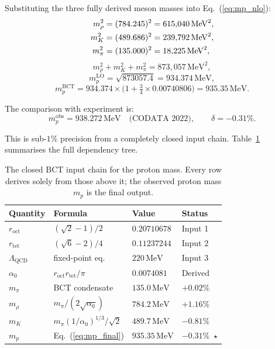 \documentclass[twocolumn,10pt,a4paper]{article}
\begin{document}
Substituting the three fully derived meson masses into
Eq.~(\ref{eq:mp_nlo}):
\begin{align}
  m_\rho^2 &= (784.245)^2 = 615{,}040\,\mathrm{MeV}^2, \notag\\
  m_K^2    &= (489.686)^2 = 239{,}792\,\mathrm{MeV}^2, \label{eq:squares}\\
  m_\pi^2  &= (135.000)^2 = 18{,}225\,\mathrm{MeV}^2, \notag
\end{align}
\begin{equation}
  \label{eq:sum}
  m_\rho^2 + m_K^2 + m_\pi^2 = 873{,}057\,\mathrm{MeV}^2,
\end{equation}
\begin{equation}
  m_p^\mathrm{LO} = \sqrt{873057.4} = 934.374\,\mathrm{MeV},
\end{equation}
\begin{equation}
  \label{eq:mp_final}
  \boxed{m_p^\mathrm{BCT} = 934.374 \times \bigl(1 + \tfrac{3}{4}\times 0.00740806\bigr)
                           = 935.35\,\mathrm{MeV}.}
\end{equation}

\noindent
The comparison with experiment is:
\begin{equation}
  m_p^\mathrm{obs} = 938.272\,\mathrm{MeV}\quad\text{(CODATA 2022)},
  \qquad \delta = -0.31\%.
\end{equation}

This is sub-$1\%$ precision from a completely closed input chain.
Table~\ref{tab:chain} summarises the full dependency tree.

\begin{table}[h]
\centering
\caption{The closed BCT input chain for the proton mass.  Every row
  derives solely from those above it; the observed proton mass $m_p$ is
  the final output.}
\label{tab:chain}
\small
\begin{tabular}{llll}
\toprule
Quantity & Formula & Value & Status \\
\midrule
$r_\mathrm{oct}$ & $(\sqrt{2}-1)/2$ & $0.20710678$ & Input 1 \\
$r_\mathrm{tet}$ & $(\sqrt{6}-2)/4$ & $0.11237244$ & Input 2 \\
$\Lambda_\mathrm{QCD}$ & fixed-point eq. & $220\,\mathrm{MeV}$ & Input 3 \\
\midrule
$\alpha_0$ & $r_\mathrm{oct}r_\mathrm{tet}/\pi$ & $0.0074081$ & Derived \\
\midrule
$m_\pi$ & BCT condensate & $135.0\,\mathrm{MeV}$ & $+0.02\%$ \\
$m_\rho$ & $m_\pi/(2\sqrt{\alpha_0})$ & $784.2\,\mathrm{MeV}$ & $+1.16\%$ \\
$m_K$ & $m_\pi(1/\alpha_0)^{1/3}/\sqrt{2}$ & $489.7\,\mathrm{MeV}$ & $-0.81\%$ \\
\midrule
$m_p$ & Eq.~(\ref{eq:mp_final}) & $935.35\,\mathrm{MeV}$ & $\mathbf{-0.31\%}$~$\star$ \\
\bottomrule
\end{tabular}
\end{table}
\end{document}
